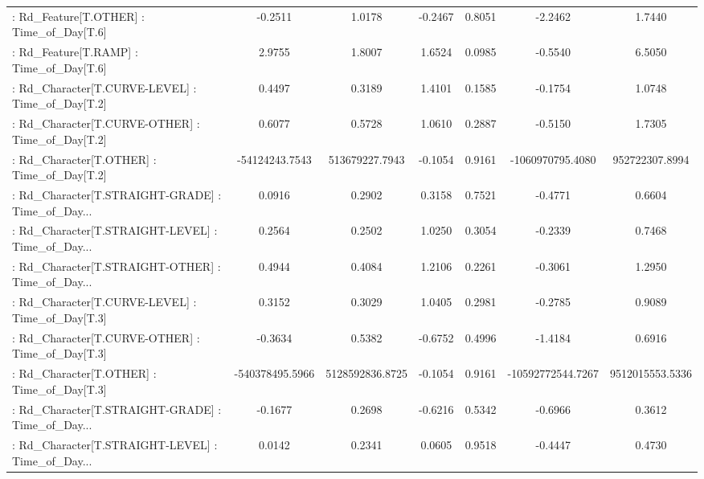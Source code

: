 \begin{longtable}{p{4cm}cccccc}
 : Rd\_Feature[T.OTHER] : Time\_of\_Day[T.6]          &           -0.2511 &            1.0178 & -0.2467 &       0.8051 &            -2.2462 &            1.7440 \\
 : Rd\_Feature[T.RAMP] : Time\_of\_Day[T.6]           &            2.9755 &            1.8007 &  1.6524 &       0.0985 &            -0.5540 &            6.5050 \\
 : Rd\_Character[T.CURVE-LEVEL] : Time\_of\_Day[T.2]  &            0.4497 &            0.3189 &  1.4101 &       0.1585 &            -0.1754 &            1.0748 \\
 : Rd\_Character[T.CURVE-OTHER] : Time\_of\_Day[T.2]  &            0.6077 &            0.5728 &  1.0610 &       0.2887 &            -0.5150 &            1.7305 \\
 : Rd\_Character[T.OTHER] : Time\_of\_Day[T.2]        &    -54124243.7543 &    513679227.7943 & -0.1054 &       0.9161 &   -1060970795.4080 &    952722307.8994 \\
 : Rd\_Character[T.STRAIGHT-GRADE] : Time\_of\_Day... &            0.0916 &            0.2902 &  0.3158 &       0.7521 &            -0.4771 &            0.6604 \\
 : Rd\_Character[T.STRAIGHT-LEVEL] : Time\_of\_Day... &            0.2564 &            0.2502 &  1.0250 &       0.3054 &            -0.2339 &            0.7468 \\
 : Rd\_Character[T.STRAIGHT-OTHER] : Time\_of\_Day... &            0.4944 &            0.4084 &  1.2106 &       0.2261 &            -0.3061 &            1.2950 \\
 : Rd\_Character[T.CURVE-LEVEL] : Time\_of\_Day[T.3]  &            0.3152 &            0.3029 &  1.0405 &       0.2981 &            -0.2785 &            0.9089 \\
 : Rd\_Character[T.CURVE-OTHER] : Time\_of\_Day[T.3]  &           -0.3634 &            0.5382 & -0.6752 &       0.4996 &            -1.4184 &            0.6916 \\
 : Rd\_Character[T.OTHER] : Time\_of\_Day[T.3]        &   -540378495.5966 &   5128592836.8725 & -0.1054 &       0.9161 &  -10592772544.7267 &   9512015553.5336 \\
 : Rd\_Character[T.STRAIGHT-GRADE] : Time\_of\_Day... &           -0.1677 &            0.2698 & -0.6216 &       0.5342 &            -0.6966 &            0.3612 \\
 : Rd\_Character[T.STRAIGHT-LEVEL] : Time\_of\_Day... &            0.0142 &            0.2341 &  0.0605 &       0.9518 &            -0.4447 &            0.4730 \\

\end{longtable}
